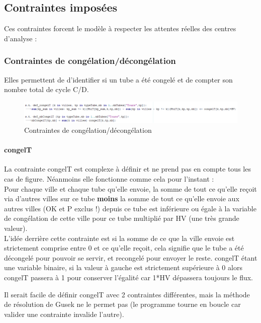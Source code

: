 \documentclass{polytech/polytech}
\numberwithin{figure}{chapter}
\begin{document}
\subsection{Contraintes imposées}

Ces contraintes forcent le modèle à respecter les attentes réelles des centres d'analyse : 

\subsubsection{Contraintes de congélation/décongélation}

Elles permettent de d'identifier si un tube a été congelé et de compter son nombre total de cycle C/D.

\begin{figure}[ht]
    \centering
    \includegraphics[width=\textwidth]{pic/congel.png}
    \caption{Contraintes de congélation/décongélation}
\end{figure}

\paragraph{congelT}

La contrainte congelT est complexe à définir et ne prend pas en compte tous les cas de figure. Néanmoins elle fonctionne comme cela pour l'instant :\\
Pour chaque ville et chaque tube qu'elle envoie, la somme de tout ce qu'elle reçoit via d'autres villes sur ce tube \textbf{moins} la somme de tout ce qu'elle envoie aux autres villes (OK et P exclus !) depuis ce tube est inférieure ou égale à la variable de congélation de cette ville pour ce tube multiplié par HV (une très grande valeur).\\

L'idée derrière cette contrainte est si la somme de ce que la ville envoie est strictement comprise entre 0 et ce qu'elle reçoit, cela signifie que le tube a été décongelé pour pouvoir se servir, et recongelé pour envoyer le reste.
congelT étant une variable binaire, si la valeur à gauche est strictement supérieure à 0 alors congelT passera à 1 pour conserver l'égalité car 1*HV dépassera toujours le flux.

Il serait facile de définir congelT avec 2 contraintes différentes, mais la méthode de résolution de Gusek ne le permet pas (le programme tourne en boucle car valider une contrainte invalide l'autre).
\end{document}
